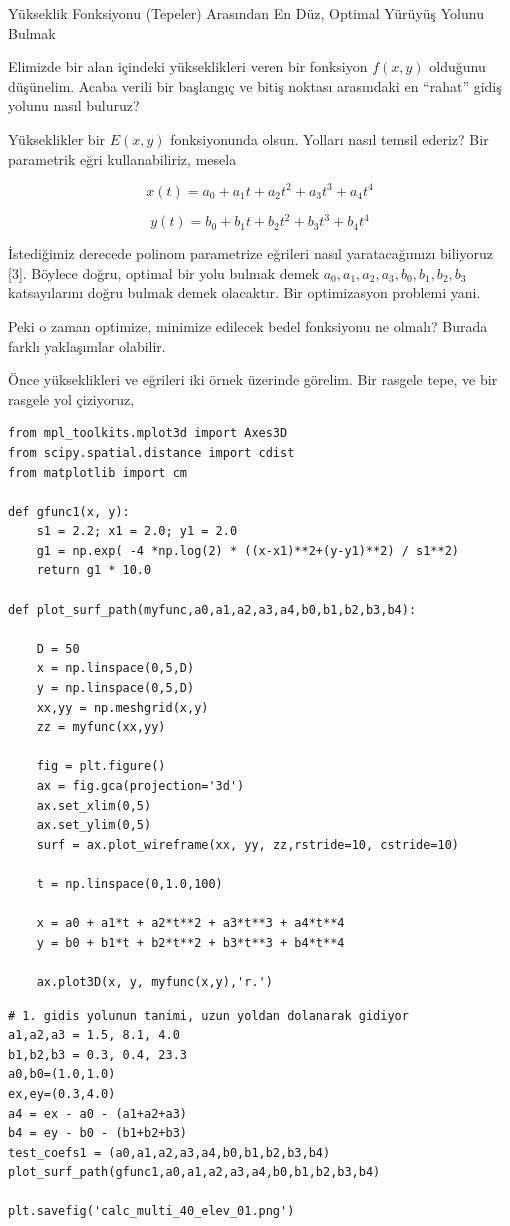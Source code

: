 \documentclass[12pt,fleqn]{article}\usepackage{../../common}
\begin{document}
Yükseklik Fonksiyonu (Tepeler) Arasından En Düz, Optimal Yürüyüş Yolunu Bulmak

Elimizde bir alan içindeki yükseklikleri veren bir fonksiyon $f(x,y)$
olduğunu düşünelim. Acaba verili bir başlangıç ve bitiş noktası arasındaki
en ``rahat'' gidiş yolunu nasıl buluruz? 

Yükseklikler bir $E(x,y)$ fonksiyonunda olsun. Yolları nasıl temsil ederiz?
Bir parametrik eğri kullanabiliriz, mesela 

$$
x(t) = a_0 + a_1 t + a_2 t^2 + a_3 t^3 + a_4 t^4
$$

$$
y(t) = b_0 + b_1 t + b_2 t^2 + b_3 t^3 + b_4 t^4
$$

İstediğimiz derecede polinom parametrize eğrileri nasıl yaratacağımızı
biliyoruz [3]. Böylece doğru, optimal bir yolu bulmak demek
$a_0,a_1,a_2,a_3,b_0,b_1,b_2,b_3$ katsayılarını doğru bulmak demek
olacaktır. Bir optimizasyon problemi yani.

Peki o zaman optimize, minimize edilecek bedel fonksiyonu ne olmalı? Burada
farklı yaklaşımlar olabilir. 

Önce yükseklikleri ve eğrileri iki örnek üzerinde görelim. Bir rasgele
tepe, ve bir rasgele yol çiziyoruz,

\begin{verbatim}
from mpl_toolkits.mplot3d import Axes3D
from scipy.spatial.distance import cdist
from matplotlib import cm

def gfunc1(x, y):
    s1 = 2.2; x1 = 2.0; y1 = 2.0
    g1 = np.exp( -4 *np.log(2) * ((x-x1)**2+(y-y1)**2) / s1**2)
    return g1 * 10.0

def plot_surf_path(myfunc,a0,a1,a2,a3,a4,b0,b1,b2,b3,b4):

    D = 50
    x = np.linspace(0,5,D)
    y = np.linspace(0,5,D)
    xx,yy = np.meshgrid(x,y)
    zz = myfunc(xx,yy)

    fig = plt.figure()
    ax = fig.gca(projection='3d')
    ax.set_xlim(0,5)
    ax.set_ylim(0,5)
    surf = ax.plot_wireframe(xx, yy, zz,rstride=10, cstride=10)

    t = np.linspace(0,1.0,100)

    x = a0 + a1*t + a2*t**2 + a3*t**3 + a4*t**4 
    y = b0 + b1*t + b2*t**2 + b3*t**3 + b4*t**4

    ax.plot3D(x, y, myfunc(x,y),'r.')
\end{verbatim}

\begin{verbatim}
# 1. gidis yolunun tanimi, uzun yoldan dolanarak gidiyor
a1,a2,a3 = 1.5, 8.1, 4.0
b1,b2,b3 = 0.3, 0.4, 23.3
a0,b0=(1.0,1.0)
ex,ey=(0.3,4.0)
a4 = ex - a0 - (a1+a2+a3)
b4 = ey - b0 - (b1+b2+b3)
test_coefs1 = (a0,a1,a2,a3,a4,b0,b1,b2,b3,b4)
plot_surf_path(gfunc1,a0,a1,a2,a3,a4,b0,b1,b2,b3,b4)

plt.savefig('calc_multi_40_elev_01.png')
\end{verbatim}
\end{document}
